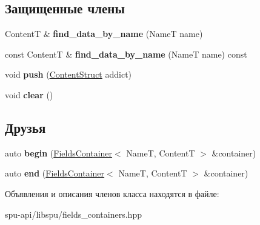 \subsection*{Защищенные члены}
\begin{DoxyCompactItemize}
\item 
\mbox{\label{class_s_p_u_1_1_fields_container_a7ecfe5c05efc0ab4aee85e7f310275d3}} 
ContentT \& {\bfseries find\+\_\+data\+\_\+by\+\_\+name} (NameT name)
\item 
\mbox{\label{class_s_p_u_1_1_fields_container_abbd05a1dba8a9275511ea9d4c4324c0b}} 
const ContentT \& {\bfseries find\+\_\+data\+\_\+by\+\_\+name} (NameT name) const
\item 
\mbox{\label{class_s_p_u_1_1_fields_container_acb3ab5dd1ac9d06eacf7617ddcfa1a58}} 
void {\bfseries push} (\hyperlink{struct_s_p_u_1_1_fields_container_1_1_content_struct}{Content\+Struct} addict)
\item 
\mbox{\label{class_s_p_u_1_1_fields_container_a3bd09bbeaaa1d4c53f1ae730f10ccdc6}} 
void {\bfseries clear} ()
\end{DoxyCompactItemize}
\subsection*{Друзья}
\begin{DoxyCompactItemize}
\item 
\mbox{\label{class_s_p_u_1_1_fields_container_a34f7de31816f657140980e92f9299322}} 
auto {\bfseries begin} (\hyperlink{class_s_p_u_1_1_fields_container}{Fields\+Container}$<$ NameT, ContentT $>$ \&container)
\item 
\mbox{\label{class_s_p_u_1_1_fields_container_a2e393ae5350f95f64be0cec98dfa95e9}} 
auto {\bfseries end} (\hyperlink{class_s_p_u_1_1_fields_container}{Fields\+Container}$<$ NameT, ContentT $>$ \&container)
\end{DoxyCompactItemize}


Объявления и описания членов класса находятся в файле\+:\begin{DoxyCompactItemize}
\item 
spu-\/api/libspu/fields\+\_\+containers.\+hpp\end{DoxyCompactItemize}
